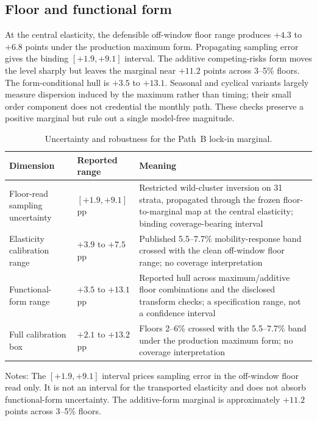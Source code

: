\documentclass[12pt]{article}
\begin{document}
\subsection{Floor and functional form}\label{sec:robustness-floor}

At the central elasticity, the defensible off-window floor range produces
$+4.3$ to $+6.8$ points under the production maximum form. Propagating
sampling error gives the binding $[+1.9,+9.1]$ interval. The additive
competing-risks form moves the level sharply but leaves the marginal near
$+11.2$ points across 3--5\% floors. The form-conditional hull is $+3.5$ to
$+13.1$. Seasonal and cyclical variants largely measure dispersion induced by
the maximum rather than timing; their small order component does not credential
the monthly path. These checks preserve a positive marginal but rule out a
single model-free magnitude.

\begin{table}[H]
\centering
\small
\caption{Uncertainty and robustness for the Path~B lock-in marginal.}
\label{tab:uncertainty-compact}
\begin{threeparttable}
\begin{tabular}{@{}p{4.3cm}p{3.4cm}p{6.0cm}@{}}
\toprule
Dimension & Reported range & Meaning \\
\midrule
Floor-read sampling uncertainty & $[+1.9,+9.1]$ pp & Restricted wild-cluster inversion on 31 strata, propagated through the frozen floor-to-marginal map at the central elasticity; binding coverage-bearing interval \\
Elasticity calibration range & $+3.9$ to $+7.5$ pp & Published 5.5--7.7\% mobility-response band crossed with the clean off-window floor range; no coverage interpretation \\
Functional-form range & $+3.5$ to $+13.1$ pp & Reported hull across maximum/additive floor combinations and the disclosed transform checks; a specification range, not a confidence interval \\
Full calibration box & $+2.1$ to $+13.2$ pp & Floors 2--6\% crossed with the 5.5--7.7\% band under the production maximum form; no coverage interpretation \\
\bottomrule
\end{tabular}
\begin{tablenotes}[flushleft]\footnotesize
\item Notes: The $[+1.9,+9.1]$ interval prices sampling error in the off-window floor read only. It is not an interval for the transported elasticity and does not absorb functional-form uncertainty. The additive-form marginal is approximately $+11.2$ points across 3--5\% floors.
\end{tablenotes}
\end{threeparttable}
\end{table}
\end{document}
